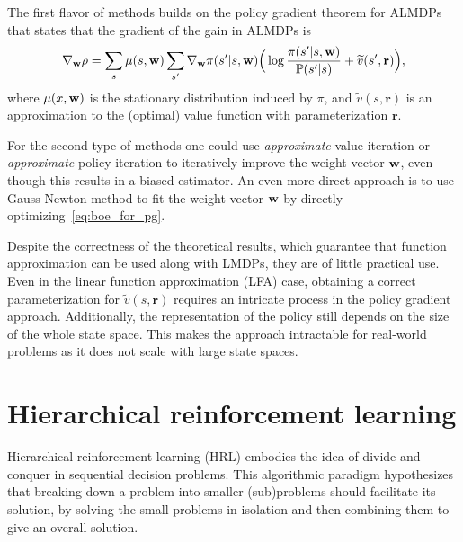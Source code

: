 The first flavor of methods builds on the policy gradient theorem for ALMDPs~\citep[cf.~Theorem 1]{Todorov2010} that states that the gradient of the gain in ALMDPs is
\begin{equation}
  \nabla_{\mathbf{w}} \rho = \sum_{s}\mu(s, \mathbf{w}) \sum_{s'} \nabla_{\mathbf{w}} \pi(s'\lvert s, \mathbf{w})\Big( \log \frac{\pi(s'\lvert s, \mathbf{w})}{\mathbb{P}(s'\lvert s)} + \widetilde v(s', \mathbf{r})\Big),
\end{equation}
where $\mu(x, \mathbf{w})$ is the stationary distribution induced by $\pi$, and $\widetilde v(s,\mathbf{r})$ is an approximation to the (optimal) value function with parameterization $\mathbf r$.

For the second type of methods one could use \textit{approximate} value iteration or \textit{approximate} policy iteration to iteratively improve the weight vector $\mathbf{w}$, even though this results in a biased estimator. An even more direct approach is to use Gauss-Newton method to fit the weight vector $\mathbf{w}$ by directly optimizing~\eqref{eq:boe_for_pg}.

Despite the correctness of the theoretical results, which guarantee that function approximation can be used along with LMDPs, they are of little practical use. Even in the linear function approximation (LFA) case, obtaining a correct parameterization for $\widetilde v(s,\mathbf{r})$ requires an intricate process  in the policy gradient approach. Additionally, the representation of the policy still depends on the size of the whole state space. This makes the approach intractable for real-world problems as it does not scale with large state spaces.


\section{Hierarchical reinforcement learning}
Hierarchical reinforcement learning (HRL) embodies the idea of divide-and-conquer in sequential decision problems. This algorithmic paradigm hypothesizes that breaking down a  problem into smaller (sub)problems should facilitate its solution, by solving the small problems in isolation and then combining them to give an overall solution.

